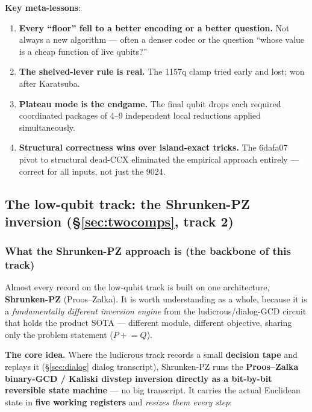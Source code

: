 \documentclass[11pt,a4paper]{article}
\begin{document}
\textbf{Key meta-lessons}:
\begin{enumerate}
  \item \textbf{Every ``floor'' fell to a better encoding or a better question.} Not always a new
    algorithm --- often a denser codec or the question ``whose value is a cheap function of live
    qubits?''

  \item \textbf{The shelved-lever rule is real.} The 1157q clamp tried early and lost; won after Karatsuba.

  \item \textbf{Plateau mode is the endgame.} The final qubit drops each required coordinated
    packages of 4--9 independent local reductions applied simultaneously.

  \item \textbf{Structural correctness wins over island-exact tricks.} The 6dafa07 pivot to
    structural dead-CCX eliminated the empirical approach entirely --- correct for all inputs,
    not just the 9024.
\end{enumerate}

\subsection{The low-qubit track: the Shrunken-PZ inversion (\S\ref{sec:twocomps}, track 2)}

\subsubsection{What the Shrunken-PZ approach is (the backbone of this track)}

Almost every record on the low-qubit track is built on one architecture, \textbf{Shrunken-PZ}
(Proos--Zalka). It is worth understanding as a whole, because it is a \emph{fundamentally different
inversion engine} from the ludicrous/dialog-GCD circuit that holds the product SOTA --- different
module, different objective, sharing only the problem statement ($P \mathrel{+}= Q$).

\textbf{The core idea.} Where the ludicrous track records a small \textbf{decision tape} and replays
it (\S\ref{sec:dialog} dialog transcript), Shrunken-PZ runs the \textbf{Proos--Zalka binary-GCD /
Kaliski divstep inversion directly as a bit-by-bit reversible state machine} --- no big transcript.
It carries the actual Euclidean state in \textbf{five working registers} and \emph{resizes them every
step}:
\end{document}
